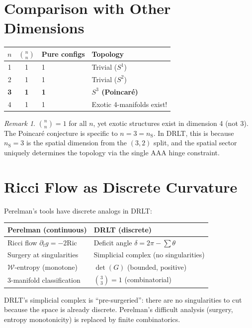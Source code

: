 \documentclass[12pt]{article}
\theoremstyle{remark}
\newtheorem{remark}[theorem]{Remark}
\newcommand{\nS}{n_{\mathrm{S}}}
\begin{document}
\section{Comparison with Other Dimensions}

\begin{center}
\begin{tabular}{ccll}
\toprule
$n$ & $\binom{n}{n}$ & Pure configs & Topology \\
\midrule
1 & 1 & 1 & Trivial ($S^1$) \\
2 & 1 & 1 & Trivial ($S^2$) \\
\textbf{3} & \textbf{1} & \textbf{1} & \textbf{$S^3$ (Poincar\'e)} \\
4 & 1 & 1 & Exotic 4-manifolds exist! \\
\bottomrule
\end{tabular}
\end{center}

\begin{remark}
$\binom{n}{n} = 1$ for all $n$, yet exotic structures
exist in dimension 4 (not 3). The Poincar\'e conjecture
is specific to $n = 3 = \nS$. In DRLT, this is because
$\nS = 3$ is the spatial dimension from the $(3,2)$ split,
and the spatial sector uniquely determines the topology
via the single AAA hinge constraint.
\end{remark}

\section{Ricci Flow as Discrete Curvature}

Perelman's tools have discrete analogs in DRLT:

\begin{center}
\begin{tabular}{ll}
\toprule
Perelman (continuous) & DRLT (discrete) \\
\midrule
Ricci flow $\partial_t g = -2\mathrm{Ric}$
  & Deficit angle $\delta = 2\pi - \sum\theta$ \\
Surgery at singularities
  & Simplicial complex (no singularities) \\
$\mathcal{W}$-entropy (monotone)
  & $\det(G)$ (bounded, positive) \\
3-manifold classification
  & $\binom{3}{3} = 1$ (combinatorial) \\
\bottomrule
\end{tabular}
\end{center}

DRLT's simplicial complex is ``pre-surgeried'': there
are no singularities to cut because the space is already
discrete. Perelman's difficult analysis (surgery, entropy
monotonicity) is replaced by finite combinatorics.
\end{document}
